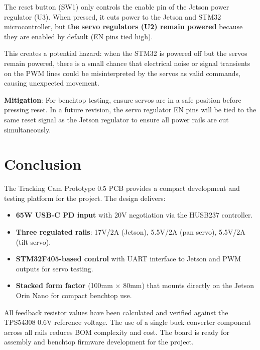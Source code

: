 \documentclass[12pt, titlepage]{article}
\begin{document}
The reset button (SW1) only controls the enable pin of the Jetson power
regulator (U3). When pressed, it cuts power to the Jetson and STM32
microcontroller, but \textbf{the servo regulators (U2) remain powered} because
they are enabled by default (EN pins tied high).

This creates a potential hazard: when the STM32 is powered off but the servos
remain powered, there is a small chance that electrical noise or signal
transients on the PWM lines could be misinterpreted by the servos as valid
commands, causing unexpected movement.

\textbf{Mitigation}: For benchtop testing, ensure servos are in a
safe position before pressing reset. In a future revision, the servo
regulator EN pins will be tied to the same reset signal as the Jetson
regulator to ensure all power rails are cut simultaneously.

\section{Conclusion}
\label{sec:conclusion}

The Tracking Cam Prototype 0.5 PCB provides a compact development and testing
platform for the \progname{} project. The design delivers:

\begin{itemize}[leftmargin=*]
  \item \textbf{65W USB-C PD input} with 20V negotiation via the
        HUSB237 controller.
  \item \textbf{Three regulated rails}: 17V/2A (Jetson), 5.5V/2A
        (pan servo), 5.5V/2A (tilt servo).
  \item \textbf{STM32F405-based control} with UART interface to Jetson
        and PWM outputs for servo testing.
  \item \textbf{Stacked form factor} (100mm $\times$ 80mm) that mounts
        directly on the Jetson Orin Nano for compact benchtop use.
\end{itemize}

All feedback resistor values have been calculated and verified against the
TPS54308 0.6V reference voltage. The use of a single buck converter component
across all rails reduces BOM complexity and cost. The board is ready for
assembly and benchtop firmware development for the \progname{} project.




\end{document}

